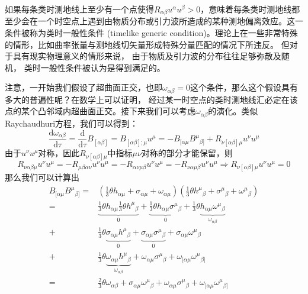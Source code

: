 \documentclass[hyperref, UTF8, a4paper]{ctexart}
\begin{document}
如果每条类时测地线上至少有一个点使得$R_{\alpha \beta } u^{\alpha } u^{\beta }  >0$，意味着每条类时测地线都至少会在一个时空点上遇到由物质分布或引力波所造成的某种测地偏离效应。这一条件被称为类时一般性条件 (timelike generic condition)。理论上在一些非常特殊的情形，比如曲率张量与测地线切矢量形成特殊分量匹配的情况下所违反。 但对于具有现实物理意义的情形来说， 由于物质及引力波的分布往往足够弥散及随机， 类时一般性条件被认为是得到满足的。 



注意，一开始我们假设了超曲面正交，也即$\omega _{\alpha \beta } =0$这个条件，那么这个假设具有多大的普遍性呢？在数学上可以证明， 经过某一时空点的类时测地线汇必定在该点的某个凸邻域内超曲面正交。接下来我们可以考虑$\omega _{\alpha \beta }$的演化。类似Raychaudhuri方程，我们可以得到：
\begin{equation*}
	\frac{\mathrm{d} \omega _{\alpha \beta }}{\mathrm{d} \tau } =\frac{\mathrm{d}}{\mathrm{d} \tau } B_{[ \alpha \beta ]} =B_{[ \alpha \beta ] ;\mu } u^{\mu } =-B_{[ \alpha \mu } B^{\mu }{}_{\beta ]} +R_{\nu [ \alpha \beta ] \mu } u^{\nu } u^{\mu }
\end{equation*}
由于$u^{\nu } u^{\mu }$对称，因此$R_{\nu [ \alpha \beta ] \mu }$中指标$\mu \nu $对称的部分才能保留，则
\begin{equation*}
	R_{\nu \alpha \beta \mu } u^{\nu } u^{\mu } =-R_{\mu \beta \alpha \nu } u^{\nu } u^{\mu } =-R_{\alpha \nu \mu \beta } u^{\nu } u^{\mu } =-R_{\nu \alpha \mu \beta } u^{\nu } u^{\mu } \Rightarrow R_{\nu [ \alpha \beta ] \mu } u^{\nu } u^{\mu } =0
\end{equation*}
那么我们可以计算出
\begin{equation*}
	\begin{aligned}
		B_{[ \alpha \mu } B^{\mu }{}_{\beta ]} = & \left(\frac{1}{3} \theta h_{\alpha \mu } +\sigma _{\alpha \mu } +\omega _{\alpha \mu }\right)\left(\frac{1}{3} \theta h^{\mu }{}_{\beta } +\sigma ^{\mu }{}_{\beta } +\omega ^{\mu }{}_{\beta }\right)\\
		= & \underbrace{\frac{1}{3} \theta h_{\alpha \mu }\frac{1}{3} \theta h^{\mu }{}_{\beta }}_{0} +\underbrace{\frac{1}{3} \theta h_{\alpha \mu } \sigma ^{\mu }{}_{\beta }}_{0} +\frac{1}{3} \theta \underbrace{h_{\alpha \mu } \omega ^{\mu }{}_{\beta }}_{\omega _{\alpha \beta }}\\
		+ & \frac{1}{3} \theta \underbrace{\sigma _{\alpha \mu } h^{\mu }{}_{\beta }}_{0} +\underbrace{\sigma _{\alpha \mu } \sigma ^{\mu }{}_{\beta }}_{0} +\sigma _{\alpha \mu } \omega ^{\mu }{}_{\beta }\\
		+ & \frac{1}{3} \theta \underbrace{\omega _{\alpha \mu } h^{\mu }{}_{\beta }}_{\omega _{\alpha \beta }} +\omega _{\alpha \mu } \sigma ^{\mu }{}_{\beta } +\omega _{[ \alpha \mu } \omega ^{\mu }{}_{\beta ]}\\
		= & \frac{2}{3} \theta \omega _{\alpha \beta } +\sigma _{\alpha \mu } \omega ^{\mu }{}_{\beta } +\omega _{\alpha \mu } \sigma ^{\mu }{}_{\beta } +\omega _{[ \alpha \mu } \omega ^{\mu }{}_{\beta ]}
	\end{aligned}
\end{equation*}
\end{document}
